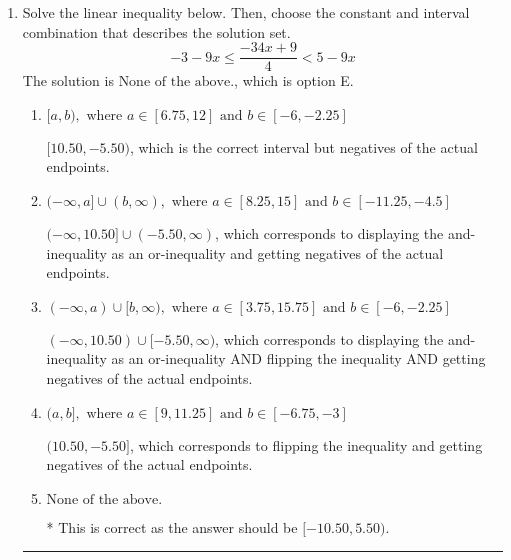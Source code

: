 \documentclass{extbook}[14pt]
\newcommand{\litem}[1]{\item #1

\rule{\textwidth}{0.4pt}}
\begin{document}
\begin{enumerate}
{\begin{enumerate}[label=\Alph*.]
This describes the values less than 6 from 7
\item \( [1, 13] \)

This describes the values no more than 6 from 7
\item \( (-\infty, 1) \cup (13, \infty) \)

This describes the values more than 6 from 7
\item \( \text{None of the above} \)

You likely thought the values in the interval were not correct.
\end{enumerate}

\textbf{General Comment:} When thinking about this language, it helps to draw a number line and try points.
}
\litem{
Solve the linear inequality below. Then, choose the constant and interval combination that describes the solution set.
\[ -3 - 9 x \leq \frac{-34 x + 9}{4} < 5 - 9 x \]The solution is \( \text{None of the above.} \), which is option E.\begin{enumerate}[label=\Alph*.]
\item \( [a, b), \text{ where } a \in [6.75, 12] \text{ and } b \in [-6, -2.25] \)

$[10.50, -5.50)$, which is the correct interval but negatives of the actual endpoints.
\item \( (-\infty, a] \cup (b, \infty), \text{ where } a \in [8.25, 15] \text{ and } b \in [-11.25, -4.5] \)

$(-\infty, 10.50] \cup (-5.50, \infty)$, which corresponds to displaying the and-inequality as an or-inequality and getting negatives of the actual endpoints.
\item \( (-\infty, a) \cup [b, \infty), \text{ where } a \in [3.75, 15.75] \text{ and } b \in [-6, -2.25] \)

$(-\infty, 10.50) \cup [-5.50, \infty)$, which corresponds to displaying the and-inequality as an or-inequality AND flipping the inequality AND getting negatives of the actual endpoints.
\item \( (a, b], \text{ where } a \in [9, 11.25] \text{ and } b \in [-6.75, -3] \)

$(10.50, -5.50]$, which corresponds to flipping the inequality and getting negatives of the actual endpoints.
\item \( \text{None of the above.} \)

* This is correct as the answer should be $[-10.50, 5.50)$.
\end{enumerate}

}
\end{enumerate}
\end{document}
